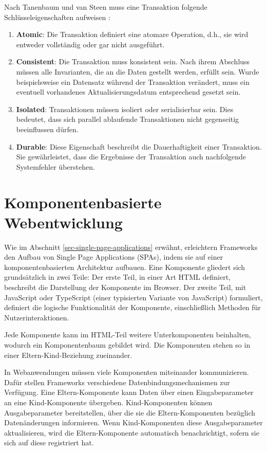 \documentclass[12pt]{book}          %
\begin{document}
Nach Tanenbaum und van Steen muss eine Transaktion folgende Schlüsseleigenschaften aufweisen \cite[38, 39]{tanenbaum_verteilte_2008}: 
\begin{enumerate}
    \item \textbf{Atomic}: Die Transaktion definiert eine atomare Operation, d.h., sie wird entweder vollständig oder gar nicht ausgeführt.
    \item \textbf{Consistent}: Die Transaktion muss konsistent sein. Nach ihrem Abschluss müssen alle Invarianten, die an die Daten gestellt werden, erfüllt sein. Wurde beispielsweise ein Datensatz während der Transaktion verändert, muss ein eventuell vorhandenes Aktualisierungsdatum entsprechend gesetzt sein.
    \item \textbf{Isolated}: Transaktionen müssen isoliert oder serialisierbar sein. Dies bedeutet, dass sich parallel ablaufende Transaktionen nicht gegenseitig beeinflussen dürfen.
    \item \textbf{Durable}: Diese Eigenschaft beschreibt die Dauerhaftigkeit einer Transaktion. Sie gewährleistet, dass die Ergebnisse der Transaktion auch nachfolgende Systemfehler überstehen.
\end{enumerate}


\section{Komponentenbasierte Webentwicklung}
\label{sec-komponentenbasierte-webentwicklung}

Wie im Abschnitt \ref{sec-single-page-applications} erwähnt, erleichtern Frameworks den Aufbau von Single Page Applications (SPAs), indem sie auf einer komponentenbasierten Architektur aufbauen. Eine Komponente gliedert sich grundsätzlich in zwei Teile: Der erste Teil, in einer Art HTML definiert, beschreibt die Darstellung der Komponente im Browser. Der zweite Teil, mit JavaScript oder TypeScript (einer typisierten Variante von JavaScript) formuliert, definiert die logische Funktionalität der Komponente, einschließlich Methoden für Nutzerinteraktionen.

Jede Komponente kann im HTML-Teil weitere Unterkomponenten beinhalten, wodurch ein Komponentenbaum gebildet wird. Die Komponenten stehen so in einer Eltern-Kind-Beziehung zueinander.

In Webanwendungen müssen viele Komponenten miteinander kommunizieren. Dafür stellen Frameworks verschiedene Datenbindungsmechanismen zur Verfügung. Eine Eltern-Komponente kann Daten über einen Eingabeparameter an eine Kind-Komponente übergeben. Kind-Komponenten können Ausgabeparameter bereitstellen, über die sie die Eltern-Komponenten bezüglich Datenänderungen informieren. Wenn Kind-Komponenten diese Ausgabeparameter aktualisieren, wird die Eltern-Komponente automatisch benachrichtigt, sofern sie sich auf diese registriert hat.
\end{document}
